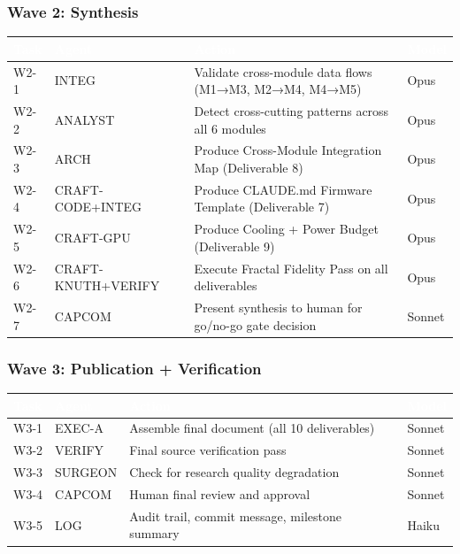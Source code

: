 \documentclass[11pt,letterpaper]{article}
\newcommand{\tableheader}[1]{\textbf{\sffamily\textcolor{white}{#1}}}
\begin{document}
\subsubsection{Wave 2: Synthesis}

\begin{center}
\begin{tabularx}{\textwidth}{L{2cm}L{3cm}XL{2cm}}
\toprule
{}
\tableheader{Task} & \tableheader{Agent} & \tableheader{Action} & \tableheader{Model} \\
\midrule
W2-1 & INTEG & Validate cross-module data flows (M1→M3, M2→M4, M4→M5) & Opus \\
W2-2 & ANALYST & Detect cross-cutting patterns across all 6 modules & Opus \\
W2-3 & ARCH & Produce Cross-Module Integration Map (Deliverable 8) & Opus \\
W2-4 & CRAFT-CODE+INTEG & Produce CLAUDE.md Firmware Template (Deliverable 7) & Opus \\
W2-5 & CRAFT-GPU & Produce Cooling + Power Budget (Deliverable 9) & Opus \\
W2-6 & CRAFT-KNUTH+VERIFY & Execute Fractal Fidelity Pass on all deliverables & Opus \\
W2-7 & CAPCOM & Present synthesis to human for go/no-go gate decision & Sonnet \\
\bottomrule
\end{tabularx}
\end{center}

\subsubsection{Wave 3: Publication + Verification}

\begin{center}
\begin{tabularx}{\textwidth}{L{2cm}L{3cm}XL{2cm}}
\toprule
{}
\tableheader{Task} & \tableheader{Agent} & \tableheader{Action} & \tableheader{Model} \\
\midrule
W3-1 & EXEC-A & Assemble final document (all 10 deliverables) & Sonnet \\
W3-2 & VERIFY & Final source verification pass & Sonnet \\
W3-3 & SURGEON & Check for research quality degradation & Sonnet \\
W3-4 & CAPCOM & Human final review and approval & Sonnet \\
W3-5 & LOG & Audit trail, commit message, milestone summary & Haiku \\
\bottomrule
\end{tabularx}
\end{center}
\end{document}
